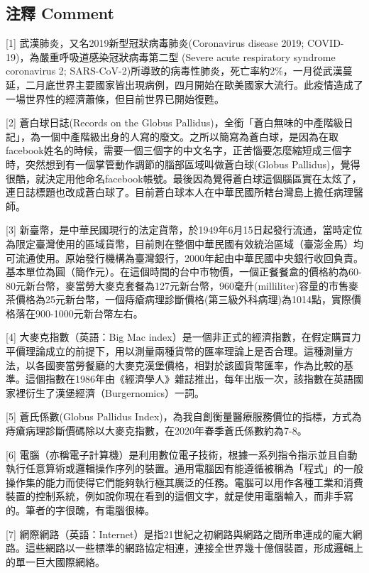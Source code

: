\documentclass[
]{article}
\begin{document}
\hypertarget{ux6ce8ux91cb-comment}{%
\subsection{注釋 Comment}\label{ux6ce8ux91cb-comment}}

{[}1{]} 武漢肺炎，又名2019新型冠狀病毒肺炎(Coronavirus disease 2019;
COVID-19)，為嚴重呼吸道感染冠狀病毒第二型 (Severe acute respiratory
syndrome coronavirus 2;
SARS-CoV-2)所導致的病毒性肺炎，死亡率約2\%，一月從武漢蔓延，二月底世界主要國家皆出現病例，四月開始在歐美國家大流行。此疫情造成了一場世界性的經濟蕭條，但目前世界已開始復甦。

{[}2{]} 蒼白球日誌(Records on the Globus
Pallidus)，全銜「蒼白無味的中產階級日記」，為一個中產階級出身的人寫的廢文。之所以簡寫為蒼白球，是因為在取facebook姓名的時候，需要一個三個字的中文名字，正苦惱要怎麼縮短成三個字時，突然想到有一個掌管動作調節的腦部區域叫做蒼白球(Globus
Pallidus)，覺得很酷，就決定用他命名facebook帳號。最後因為覺得蒼白球這個腦區實在太炫了，連日誌標題也改成蒼白球了。目前蒼白球本人在中華民國所轄台灣島上擔任病理醫師。

{[}3{]}
新臺幣，是中華民國現行的法定貨幣，於1949年6月15日起發行流通，當時定位為限定臺灣使用的區域貨幣，目前則在整個中華民國有效統治區域（臺澎金馬）均可流通使用。原始發行機構為臺灣銀行，2000年起由中華民國中央銀行收回負責。基本單位為圓（簡作元）。在這個時間的台中市物價，一個正餐餐盒的價格約為60-80元新台幣，麥當勞大麥克套餐為127元新台幣，960毫升(milliliter)容量的市售麥茶價格為25元新台幣，一個痔瘡病理診斷價格(第三級外科病理)為1014點，實際價格落在900-1000元新台幣左右。

{[}4{]} 大麥克指數（英語：Big Mac
index）是一個非正式的經濟指數，在假定購買力平價理論成立的前提下，用以測量兩種貨幣的匯率理論上是否合理。這種測量方法，以各國麥當勞餐廳的大麥克漢堡價格，相對於該國貨幣匯率，作為比較的基準。這個指數在1986年由《經濟學人》雜誌推出，每年出版一次，該指數在英語國家裡衍生了漢堡經濟（Burgernomics）一詞。

{[}5{]} 蒼氏係數(Globus Pallidus
Index)，為我自創衡量醫療服務價位的指標，方式為痔瘡病理診斷價碼除以大麥克指數，在2020年春季蒼氏係數約為7-8。

{[}6{]}
電腦（亦稱電子計算機）是利用數位電子技術，根據一系列指令指示並且自動執行任意算術或邏輯操作序列的裝置。通用電腦因有能遵循被稱為「程式」的一般操作集的能力而使得它們能夠執行極其廣泛的任務。電腦可以用作各種工業和消費裝置的控制系統，例如說你現在看到的這個文字，就是使用電腦輸入，而非手寫的。筆者的字很醜，有電腦很棒。

{[}7{]}
網際網路（英語：Internet）是指21世紀之初網路與網路之間所串連成的龐大網路。這些網路以一些標準的網路協定相連，連接全世界幾十億個裝置，形成邏輯上的單一巨大國際網絡。
\end{document}
